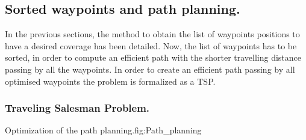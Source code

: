   \subsection{Sorted waypoints and path planning.} \label{sec:sorted}
In the previous sections, the method to obtain the list of waypoints positions to have a desired coverage has been detailed. Now, the list of waypoints has to be sorted, in order to compute an efficient path with the shorter travelling distance passing by all the waypoints. In order to create an efficient path passing by all optimised waypoints the problem is formalized as a TSP. %

 
\subsubsection*{Traveling Salesman Problem. }\label{sec:TSP2}


\begin{mfigures}[!]{Optimization of the path planning.}{fig:Path_planning} \centering
{}
\hspace{1cm}
\end{mfigures}	


